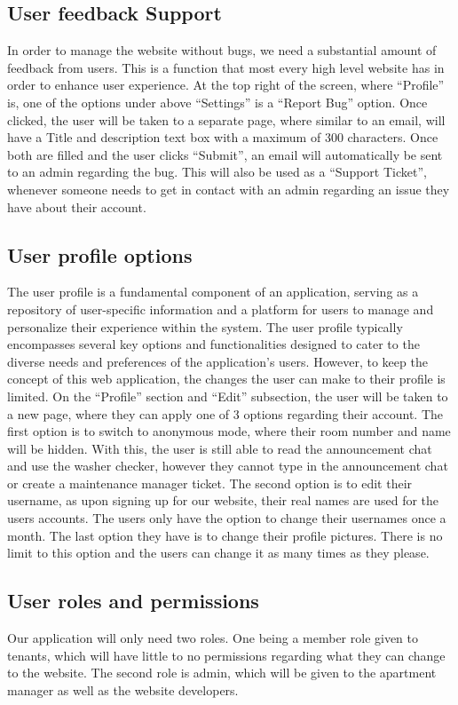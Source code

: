 \documentclass[conference]{IEEEtran}
\begin{document}
\subsection{User feedback Support}
In order to manage the website without bugs, we need a substantial amount of feedback from users. This is a function that most every high level website has in order to enhance user experience. At the top right of the screen, where “Profile” is, one of the options under above “Settings” is a “Report Bug” option. Once clicked, the user will be taken to a separate page, where similar to an email, will have a Title and description text box with a maximum of 300 characters. Once both are filled and the user clicks “Submit”, an email will automatically be sent to an admin regarding the bug. This will also be used as a “Support Ticket”, whenever someone needs to get in contact with an admin regarding an issue they have about their account.
\subsection{User profile options}
The user profile is a fundamental component of an application, serving as a repository of user-specific information and a platform for users to manage and personalize their experience within the system. The user profile typically encompasses several key options and functionalities designed to cater to the diverse needs and preferences of the application's users. However, to keep the concept of this web application, the changes the user can make to their profile is limited. On the “Profile” section and “Edit” subsection, the user will be taken to a new page, where they can apply one of 3 options regarding their account. The first option is to switch to anonymous mode, where their room number and name will be hidden. With this, the user is still able to read the announcement chat and use the washer checker, however they cannot type in the announcement chat or create a maintenance manager ticket. The second option is to edit their username, as upon signing up for our website, their real names are used for the users accounts. The users only have the option to change their usernames once a month. The last option they have is to change their profile pictures. There is no limit to this option and the users can change it as many times as they please.
\subsection{User roles and permissions}
Our application will only need two roles. One being a member role given to tenants, which will have little to no permissions regarding what they can change to the website. The second role is admin, which will be given to the apartment manager as well as the website developers.
\end{document}

